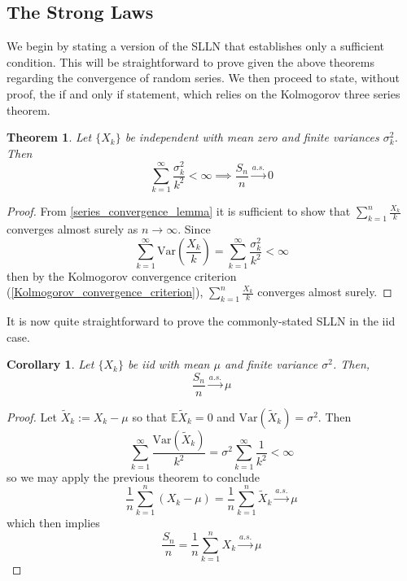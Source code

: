 \documentclass[12pt]{article}
\newcommand{\E}{\mathbb{E}}
\newcommand{\Var}{\mathrm{Var}}
\newtheorem{thm}{Theorem}
\newtheorem{corollary}{Corollary}
\begin{document}
\subsection{The Strong Laws}
We begin by stating a version of the SLLN that establishes only a sufficient condition. This will be straightforward to prove given the above theorems regarding the convergence of random 
series. We then proceed to state, without proof, the if and only if statement, which relies on the Kolmogorov three series theorem.

\begin{thm}
Let $\{X_k\}$ be independent with mean zero and finite variances $\sigma_k^2$. Then 
\[\sum_{k = 1}^{\infty} \frac{\sigma_k^2}{k^2} < \infty \implies \frac{S_n}{n} \overset{a.s.}{\to} 0\]
\end{thm}

\begin{proof}
From \ref{series_convergence_lemma} it is sufficient to show that $\sum_{k = 1}^{n} \frac{X_k}{k}$ converges almost surely as $n \to \infty$. Since 
\[\sum_{k = 1}^{\infty} \Var\left(\frac{X_k}{k}\right) = \sum_{k = 1}^{\infty} \frac{\sigma_k^2}{k^2} < \infty \]
then by the Kolmogorov convergence criterion (\ref{Kolmogorov_convergence_criterion}), $\sum_{k = 1}^{n} \frac{X_k}{k}$ converges almost surely. 
\end{proof}
It is now quite straightforward to prove the commonly-stated SLLN in the iid case. 
\begin{corollary} 
Let $\{X_k\}$ be iid with mean $\mu$ and finite variance $\sigma^2$. Then, 
\[\frac{S_n}{n} \overset{a.s.}{\to} \mu\]
\end{corollary}

\begin{proof}
Let $\tilde{X}_k := X_k - \mu$ so that $\E \tilde{X}_k = 0$ and $\Var(\tilde{X}_k) = \sigma^2$. Then 
\[\sum_{k = 1}^{\infty} \frac{\Var(\tilde{X}_k)}{k^2} = \sigma^2 \sum_{k = 1}^{\infty} \frac{1}{k^2} < \infty\]
so we may apply the previous theorem to conclude 
\[\frac{1}{n} \sum_{k = 1}^{n} (X_k - \mu) = \frac{1}{n} \sum_{k = 1}^{n} \tilde{X}_k \overset{a.s.}{\to} \mu \]
which then implies 
\[\frac{S_n}{n} = \frac{1}{n} \sum_{k = 1}^{n} X_k \overset{a.s.}{\to} \mu \]
\end{proof}
\end{document}

